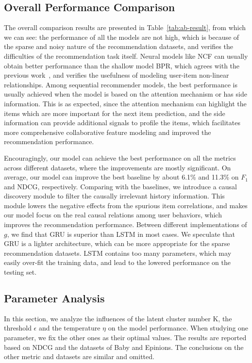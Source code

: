 \documentclass[conference]{IEEEtran}
\theoremstyle{definition}
\theoremstyle{theorem}
\theoremstyle{proof}
\theoremstyle{remark}
\begin{document}
\begin{table*}[!t]
\begin{threeparttable}
{\begin{tabular}
				\hline \hline 
			\end{tabular}
		}        
	\end{threeparttable}    
	\label{tab:ab-result}   
	\vspace{-0.cm}
\end{table*}


\subsection{Overall Performance Comparison}\label{overall}
The overall comparison results are presented in Table~\ref{tab:ab-result}, from which we can see:
{the performance of all the models are not high, which is because of the sparse and noisy nature of the recommendation datasets, and verifies the difficulties of the recommendation task itself.}
Neural models like NCF can usually obtain better performance than the shallow model BPR, which agrees with the previous work~\cite{ncf}, and verifies the usefulness of modeling user-item non-linear relationships.
Among sequential recommender models, the best performance is usually achieved when the model is based on the attention mechanism or has side information.
This is as expected, since the attention mechanism can highlight the items which are more important for the next item prediction, and the side information can provide additional signals to profile the items, which facilitates more comprehensive collaborative feature modeling and improved the recommendation performance. 

Encouragingly, our model can achieve the best performance on all the metrics across different datasets, where the improvements are mostly significant.
On average, our model can improve the best baseline by about {6.1\% and 11.3\%} on $F_1$ and NDCG, respectively.
Comparing with the baselines, we introduce a causal discovery module to filter the causally irrelevant history information.
This module lowers the negative effects from the spurious item correlations, and makes our model focus on the real causal relations among user behaviors, which improves the recommendation performance.
Between different implementations of $g$, we find that GRU is superior than LSTM in most cases.
We speculate that GRU is a lighter architecture, which can be more appropriate for the sparse recommendation datasets.
LSTM contains too many parameters, which may easily over-fit the training data, and lead to the lowered performance on the testing set.



\subsection{Parameter Analysis}
In this section, we analyze the influences of the latent cluster number K, the threshold $\epsilon$ and the temperature $\eta$ on the model performance.
When studying one parameter, we fix the other ones as their optimal values.
The results are reported based on NDCG and the datasets of Baby and Epinions.
The conclusions on the other metric and datasets are similar and omitted.
\end{document}
